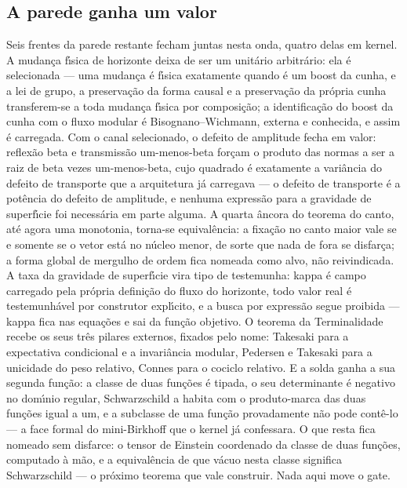 \documentclass[11pt]{article}
\theoremstyle{definition}\newtheorem{deriv}{Derivação}
\begin{document}
\subsection*{A parede ganha um valor}Seis frentes da parede restante fecham juntas nesta onda, quatro delas em kernel. A mudan\c{c}a f\'\i{}sica de horizonte deixa de ser um unit\'ario arbitr\'ario: ela \'e selecionada --- uma mudan\c{c}a \'e f\'\i{}sica exatamente quando \'e um boost da cunha, e a lei de grupo, a preserva\c{c}\~ao da forma causal e a preserva\c{c}\~ao da pr\'opria cunha transferem-se a toda mudan\c{c}a f\'\i{}sica por composi\c{c}\~ao; a identifica\c{c}\~ao do boost da cunha com o fluxo modular \'e Bisognano--Wichmann, externa e conhecida, e assim \'e carregada. Com o canal selecionado, o defeito de amplitude fecha em valor: reflex\~ao beta e transmiss\~ao um-menos-beta for\c{c}am o produto das normas a ser a raiz de beta vezes um-menos-beta, cujo quadrado \'e exatamente a vari\^ancia do defeito de transporte que a arquitetura j\'a carregava --- o defeito de transporte \'e a pot\^encia do defeito de amplitude, e nenhuma express\~ao para a gravidade de superf\'\i{}cie foi necess\'aria em parte alguma. A quarta \^ancora do teorema do canto, at\'e agora uma monotonia, torna-se equival\^encia: a fixa\c{c}\~ao no canto maior vale se e somente se o vetor est\'a no n\'ucleo menor, de sorte que nada de fora se disfar\c{c}a; a forma global de mergulho de ordem fica nomeada como alvo, n\~ao reivindicada. A taxa da gravidade de superf\'\i{}cie vira tipo de testemunha: kappa \'e campo carregado pela pr\'opria defini\c{c}\~ao do fluxo do horizonte, todo valor real \'e testemunh\'avel por construtor expl\'\i{}cito, e a busca por express\~ao segue proibida --- kappa fica nas equa\c{c}\~oes e sai da fun\c{c}\~ao objetivo. O teorema da Terminalidade recebe os seus tr\^es pilares externos, fixados pelo nome: Takesaki para a expectativa condicional e a invari\^ancia modular, Pedersen e Takesaki para a unicidade do peso relativo, Connes para o cociclo relativo. E a solda ganha a sua segunda fun\c{c}\~ao: a classe de duas fun\c{c}\~oes \'e tipada, o seu determinante \'e negativo no dom\'\i{}nio regular, Schwarzschild a habita com o produto-marca das duas fun\c{c}\~oes igual a um, e a subclasse de uma fun\c{c}\~ao provadamente n\~ao pode cont\^e-lo --- a face formal do mini-Birkhoff que o kernel j\'a confessara. O que resta fica nomeado sem disfarce: o tensor de Einstein coordenado da classe de duas fun\c{c}\~oes, computado \`a m\~ao, e a equival\^encia de que v\'acuo nesta classe significa Schwarzschild --- o pr\'oximo teorema que vale construir. Nada aqui move o gate.
\end{document}

